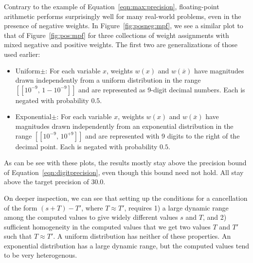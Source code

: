 \documentclass{easychair}
\newcommand{\obar}[1]{\overline{#1}}
\newcommand{\interval}[1]{[\![#1]\!]}
\begin{document}
Contrary to the example of
Equation~\ref{eqn:max:precision},
floating-point arithmetic performs surprisingly well for
many real-world
problems, even in the presence of negative weights.
In Figure~\ref{fig:posneg:mpf}, we see a similar plot to that of Figure~\ref{fig:pos:mpf} for
three collections of weight assignments with mixed negative and positive weights.  The first two are generalizations of those used earlier:
\begin{itemize}
\item \textsf{Uniform$\pm$}: For each variable $x$, weights $w(x)$ and $w(\obar{x})$ have magnitudes drawn independently
from a uniform distribution in the range  $\interval{10^{-9},\,1-10^{-9}}$ and are represented as 9-digit decimal numbers.  Each is negated with probability $0.5$.
\item \textsf{Exponential$\pm$}: For each variable $x$, weights $w(x)$ and $w(\obar{x})$ have magnitudes
  drawn independently from an exponential distribution in the range $\interval{10^{-9},\,10^{+9}}$ and are represented with 9 digits to the right of the decimal point.  Each is negated with probability $0.5$.
\end{itemize}
As can be see with these plots, the results mostly stay above the precision bound of Equation~\ref{eqn:digitprecision},
even though this bound need not hold.  All stay above the target precision of $30.0$.

On deeper inspection, we can see that setting up the conditions for a
cancellation of the form $(s + T) - T'$, where $T \approx T'$, requires
1) a large dynamic range among the computed values to give widely different values $s$ and $T$, and 2) sufficient
homogeneity in the computed values that we get two values $T$ and
$T'$ such that $T \approx T'$.  A uniform distribution has neither of
these properties.  An exponential distribution has a large dynamic
range, but the computed values tend to be very heterogenous.
\end{document}
